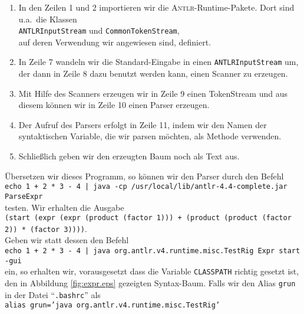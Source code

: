 \begin{enumerate}
\item In den Zeilen 1 und 2 importieren wir die \textsc{Antlr}-Runtime-Pakete.
      Dort sind u.a.~die Klassen  
      \\[0.2cm]
      \hspace*{1.3cm}
      \texttt{ANTLRInputStream} \quad und \quad \texttt{CommonTokenStream}, 
      \\[0.2cm]
      auf deren Verwendung wir angewiesen sind, definiert.
\item In Zeile 7 wandeln wir die Standard-Eingabe in einen \texttt{ANTLRInputStream} um,
      der dann in Zeile 8 dazu benutzt werden kann, einen Scanner zu erzeugen. 
\item Mit Hilfe des  Scanners erzeugen wir in Zeile 9 einen TokenStream und aus diesem k\"onnen wir 
      in Zeile 10 einen Parser erzeugen.
\item Der Aufruf des Parsers erfolgt in Zeile 11, indem wir den Namen der syntaktischen Variable,
      die wir parsen m\"ochten, als Methode verwenden.
\item Schlie{\ss}lich geben wir den erzeugten Baum noch als Text aus.
\end{enumerate}
\"Ubersetzen wir dieses Programm, so k\"onnen wir den Parser durch den Befehl
\\[0.2cm]
\hspace*{1.3cm}
\texttt{echo  1 + 2 * 3 - 4 | java -cp /usr/local/lib/antlr-4.4-complete.jar ParseExpr}
\\[0.2cm]
testen.  Wir erhalten die Ausgabe
\\[0.2cm]
\hspace*{0.3cm}
\texttt{(start (expr (expr (product (factor 1))) + (product (product (factor 2)) * (factor 3))))}.
\\[0.2cm]
Geben wir statt dessen den Befehl
\\[0.2cm]
\hspace*{1.3cm}
\texttt{echo 1 + 2 * 3 - 4 | java org.antlr.v4.runtime.misc.TestRig Expr start -gui}
\\[0.2cm]
ein, so erhalten wir, vorausgesetzt dass die Variable \texttt{CLASSPATH} richtig gesetzt ist,
den in Abbildung \ref{fig:expr.eps} gezeigten Syntax-Baum.  Falls wir den Alias \texttt{grun} in der
Datei ``\texttt{.bashrc}'' als
\\[0.2cm]
\hspace*{1.3cm}
\texttt{alias grun='java org.antlr.v4.runtime.misc.TestRig'}
\\[0.2cm]

